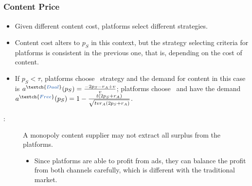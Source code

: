 \documentclass{beamer}
\newcommand{\hl}[1]{\textcolor{myblue}{#1}}
\newcommand{\fc}{\textch{\hl{Free-content}}}
\newcommand{\dual}{\textch{\hl{Dual}}}
\newcommand{\free}{\textch{\hl{Free}}}
\newcommand{\Pp}[1]{\text{Proposition #1}}
\begin{document}
\begin{frame}%
    \frametitle{Content Price}
    \framesubtitle{}
    \begin{itemize}
        \item Given different content cost, platforms select different strategies.
        \item Content cost alters to $p_S$ in this context, but the strategy selecting criteria
            for platforms is consistent in the previous one, that is, depending on 
            the cost of content.
        \item If $p_S<\tau$, platforms choose \dual\ strategy and the 
            demand for content in this case is
            $a^\dual(p_S)=\frac{-2p_S-r_A+v}{v}$; platforms choose \fc\
            and have the demand $a^\free(p_S)=1-\frac{t(2p_S+r_A)}{\sqrt{tvr_A(2p_S+r_A)}}$.
    \end{itemize}
    \begin{description}
        \item[\Pp{4}:] A monopoly content supplier may not extract all surplus
            from the platforms.
            \begin{itemize}
                \item Since platforms are able to profit from ads, \hl{they can
                    balance the profit from both channels carefully,
                    which is different with the traditional market.}
            \end{itemize}
    \end{description}
\end{frame}
\end{document}
